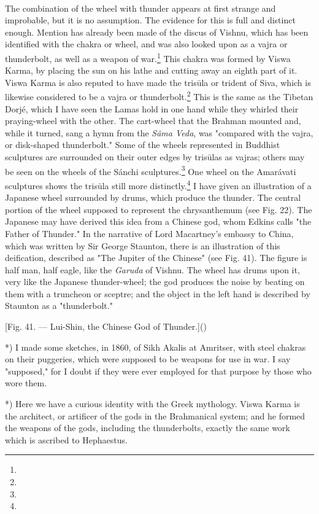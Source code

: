 \documentclass[a4paper, 11pt, oneside, polutonikogreek, english]{article}
\begin{document}
\paragraph{}
The combination of the wheel with thunder appears at first strange and improbable, but it is no assumption. The evidence for this is full and distinct enough. Mention has already been made of the discus of Vishnu, which has been identified with the chakra or wheel, and was also looked upon as a vajra or thunderbolt, as well as a weapon of war.\footnote{} This chakra was formed by Viswa Karma, by placing the sun on his lathe and cutting away an eighth part of it. Viswa Karma is also reputed to have made the trisūla or trident of Siva, which is likewise considered to be a vajra or thunderbolt.\footnote{} This is the same as the Tibetan Dorjé, which I have seen the Lamas hold in one hand while they whirled their praying-wheel with the other. The cart-wheel that the Brahman mounted and, while it turned, sang a hymn from the \emph{Sâma Veda}, was "compared with the vajra, or disk-shaped thunderbolt." Some of the wheels represented in Buddhist sculptures are surrounded on their outer edges by trisūlas as vajras; others may be seen on the wheels of the Sánchi sculptures.\footnote{} One wheel on the Amarávati sculptures shows the trisūla still more distinctly.\footnote{} I have given an illustration of a Japanese wheel surrounded by drums, which produce the thunder. The central portion of the wheel supposed to represent the chrysanthemum (see Fig. 22). The Japanese may have derived this idea from a Chinese god, whom Edkins calls "the Father of Thunder." In the narrative of Lord Macartney's embassy to China, which was written by Sir George Staunton, there is an illustration of this deification, described as "The Jupiter of the Chinese" (see Fig. 41). The figure is half man, half eagle, like the \emph{Garuda} of Vishnu. The wheel has drums upon it, very like the Japanese thunder-wheel; the god produces the noise by beating on them with a truncheon or sceptre; and the object in the left hand is described by Staunton as a "thunderbolt."

[Fig. 41. --- Lui-Shin, the Chinese God of Thunder.]()

*) I made some sketches, in 1860, of Sikh Akalis at Amritser, with steel chakras on their puggeries, which were supposed to be weapons for use in war. I say "supposed," for I doubt if they were ever employed for that purpose by those who wore them.

*) Here we have a curious identity with the Greek mythology. Viswa Karma is the architect, or artificer of the gods in the Brahmanical system; and he formed the weapons of the gods, including the thunderbolts, exactly the same work which is ascribed to Hephaestus.
\end{document}
